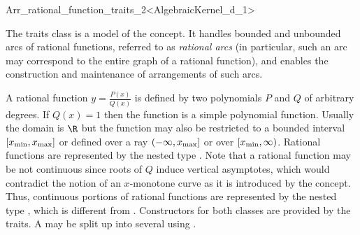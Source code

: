 
\ccRefPageBegin
\begin{ccRefClass}{Arr_rational_function_traits_2<AlgebraicKernel_d_1>}

\ccDefinition

The traits class \ccRefName{} is a model of the 
concept. It handles bounded and unbounded arcs of rational functions,
referred to as {\sl rational arcs} (in particular, such an arc may
correspond to the entire graph of a rational function), and enables the
construction and maintenance of arrangements of such arcs. 

A rational function $y = \frac{P(x)}{Q(x)}$ is defined by two polynomials 
$P$ and $Q$ of arbitrary degrees. 
If $Q(x) = 1$ then the function is a simple polynomial function.
Usually the domain is $\R$ but the function may also be 
restricted to a bounded interval $[x_{\rm min}, x_{\rm max}]$ 
or defined over a ray $(-\infty, x_{\rm max}]$ or over $[x_{\rm min}, \infty)$. 
Rational functions are represented by the nested type . 
Note that a rational function may be not continuous since roots of $Q$ induce 
vertical asymptotes, which would contradict the notion of an $x$-monotone curve
as it is introduced by the  concept. 
Thus, continuous portions of rational functions are represented by the nested 
type , which is different from .
Constructors for both classes are provided by the traits. 
A  may be split up into several 
using . 



\end{ccRefClass}
